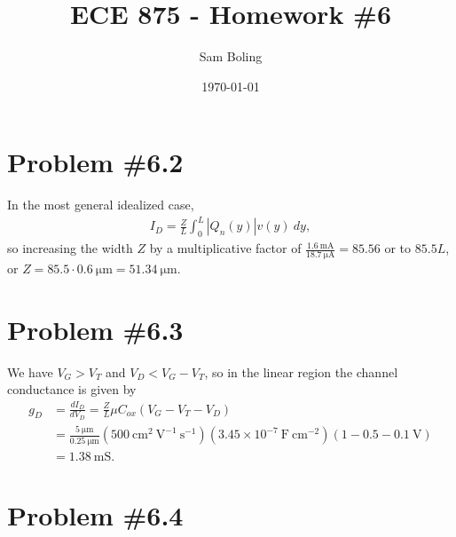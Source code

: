 \documentclass{article}
\title{ECE 875 - Homework \#6}
\author{Sam Boling}
\date{\today}
\begin{document}
\maketitle

\section*{Problem \#6.2}

In the most general idealized case,
\begin{align*}
I_D = \frac{Z}{L} \int_0^L |Q_n(y)|v(y)~dy,
\end{align*}
so increasing the width $Z$ by a multiplicative factor of 
$\frac{1.6 ~\mathrm{mA}}{18.7 ~\mathrm{\mu A}} = 85.56$ or to
$85.5 L$, or
$Z = 85.5 \cdot 0.6 ~\mathrm{\mu m} = 51.34 ~\mathrm{\mu m}$.

\section*{Problem \#6.3}
We have $V_G > V_T$ and $V_D < V_G - V_T$, so in the linear region the channel
conductance is given by
\begin{align*}
g_D &= \frac{dI_D}{dV_D} = \frac{Z}{L} \mu C_{ox} \left(V_G - V_T - V_D\right) \\
    &= \frac{5 ~\mathrm{\mu m}}
            {0.25 ~\mathrm{\mu m}}
            (500 ~\mathrm{cm}^{2}~\mathrm{V}^{-1}~\mathrm{s}^{-1})
            (3.45 \times 10^{-7} ~\mathrm{F}~\mathrm{cm}^{-2}) 
            (1 - 0.5 - 0.1 ~\mathrm{V}) \\
    &= 1.38 ~\mathrm{mS}.
\end{align*}

\section*{Problem \#6.4}

\end{document}
